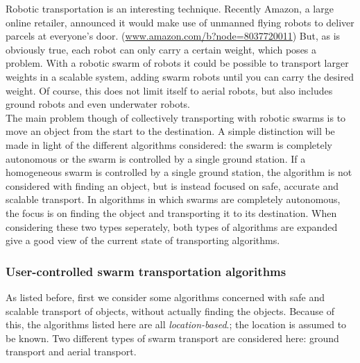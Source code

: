 
Robotic transportation is an interesting technique. 
Recently Amazon, a large online retailer, announced it would make use of unmanned flying robots to deliver parcels at everyone's door. (\url{www.amazon.com/b?node=8037720011})
But, as is obviously true, each robot can only carry a certain weight, which poses a problem. 
With a robotic swarm of robots it could be possible to transport larger weights in a scalable system, adding swarm robots until you can carry the desired weight. 
Of course, this does not limit itself to aerial robots, but also includes ground robots and even underwater robots. \\
The main problem though of collectively transporting with robotic swarms is to move an object from the start to the destination.
A simple distinction will be made in light of the different algorithms considered: the swarm is completely autonomous or the swarm is controlled by a single ground station.
If a homogeneous swarm is controlled by a single ground station, the algorithm is not considered with finding an object, but is instead focused on safe, accurate and scalable transport. 
In algorithms in which swarms are completely autonomous, the focus is on finding the object and transporting it to its destination.
When considering these two types seperately, both types of algorithms are expanded give a good view of the current state of transporting algorithms.  \\

\subsubsection{User-controlled swarm transportation algorithms}
As listed before, first we consider some algorithms concerned with safe and scalable transport of objects, without actually finding the objects. Because of this, the algorithms listed here are all \emph{location-based}.; the location is assumed to be known. 
Two different types of swarm transport are considered here: ground transport and aerial transport. \\

